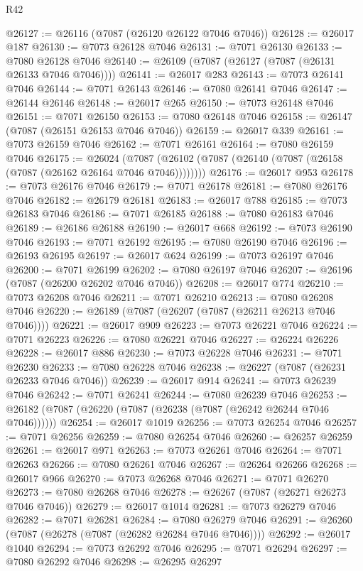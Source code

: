 \begin{lexlean}{R42}
\begin{coremodule}
{@26127 := @26116 (@7087 (@26120 @26122 @7046 @7046))
@26128 := @26017 @187
@26130 := @7073 @26128 @7046
@26131 := @7071 @26130
@26133 := @7080 @26128 @7046
@26140 := @26109 (@7087 (@26127 (@7087 (@26131 @26133 @7046 @7046))))
@26141 := @26017 @283
@26143 := @7073 @26141 @7046
@26144 := @7071 @26143
@26146 := @7080 @26141 @7046
@26147 := @26144 @26146
@26148 := @26017 @265
@26150 := @7073 @26148 @7046
@26151 := @7071 @26150
@26153 := @7080 @26148 @7046
@26158 := @26147 (@7087 (@26151 @26153 @7046 @7046))
@26159 := @26017 @339
@26161 := @7073 @26159 @7046
@26162 := @7071 @26161
@26164 := @7080 @26159 @7046
@26175 := @26024
    (@7087 (@26102 (@7087 (@26140 (@7087 (@26158 (@7087 (@26162 @26164 @7046 @7046))))))))
@26176 := @26017 @953
@26178 := @7073 @26176 @7046
@26179 := @7071 @26178
@26181 := @7080 @26176 @7046
@26182 := @26179 @26181
@26183 := @26017 @788
@26185 := @7073 @26183 @7046
@26186 := @7071 @26185
@26188 := @7080 @26183 @7046
@26189 := @26186 @26188
@26190 := @26017 @668
@26192 := @7073 @26190 @7046
@26193 := @7071 @26192
@26195 := @7080 @26190 @7046
@26196 := @26193 @26195
@26197 := @26017 @624
@26199 := @7073 @26197 @7046
@26200 := @7071 @26199
@26202 := @7080 @26197 @7046
@26207 := @26196 (@7087 (@26200 @26202 @7046 @7046))
@26208 := @26017 @774
@26210 := @7073 @26208 @7046
@26211 := @7071 @26210
@26213 := @7080 @26208 @7046
@26220 := @26189 (@7087 (@26207 (@7087 (@26211 @26213 @7046 @7046))))
@26221 := @26017 @909
@26223 := @7073 @26221 @7046
@26224 := @7071 @26223
@26226 := @7080 @26221 @7046
@26227 := @26224 @26226
@26228 := @26017 @886
@26230 := @7073 @26228 @7046
@26231 := @7071 @26230
@26233 := @7080 @26228 @7046
@26238 := @26227 (@7087 (@26231 @26233 @7046 @7046))
@26239 := @26017 @914
@26241 := @7073 @26239 @7046
@26242 := @7071 @26241
@26244 := @7080 @26239 @7046
@26253 := @26182 (@7087 (@26220 (@7087 (@26238 (@7087 (@26242 @26244 @7046 @7046))))))
@26254 := @26017 @1019
@26256 := @7073 @26254 @7046
@26257 := @7071 @26256
@26259 := @7080 @26254 @7046
@26260 := @26257 @26259
@26261 := @26017 @971
@26263 := @7073 @26261 @7046
@26264 := @7071 @26263
@26266 := @7080 @26261 @7046
@26267 := @26264 @26266
@26268 := @26017 @966
@26270 := @7073 @26268 @7046
@26271 := @7071 @26270
@26273 := @7080 @26268 @7046
@26278 := @26267 (@7087 (@26271 @26273 @7046 @7046))
@26279 := @26017 @1014
@26281 := @7073 @26279 @7046
@26282 := @7071 @26281
@26284 := @7080 @26279 @7046
@26291 := @26260 (@7087 (@26278 (@7087 (@26282 @26284 @7046 @7046))))
@26292 := @26017 @1040
@26294 := @7073 @26292 @7046
@26295 := @7071 @26294
@26297 := @7080 @26292 @7046
@26298 := @26295 @26297
}
\end{coremodule}
\end{lexlean}
